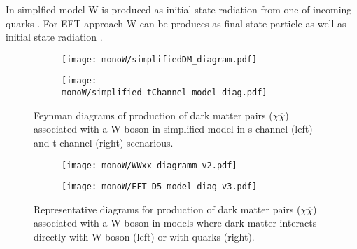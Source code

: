





In simplfied model W is produced as initial state radiation from one of incoming quarks . 
For EFT approach W can be produces as final state particle  as well as initial state radiation .

\begin{figure}[hb]

\centering
\begin{subfigure}{.5\textwidth}
  \centering
  \texttt{[image: monoW/simplifiedDM\_diagram.pdf]}
\end{subfigure}%
\begin{subfigure}{.5\textwidth}
  \centering
  \texttt{[image: monoW/simplified\_tChannel\_model\_diag.pdf]}
\end{subfigure}
  \caption{Feynman diagrams of production of dark matter pairs ($\chi\overline{\chi}$) associated with a W boson in simplified model 
	   in s-channel (left) and t-channel (right) scenarious.}
  \label{fig:feynMonoWSimple}
\end{figure}

\begin{figure}[hb]

\centering
\begin{subfigure}{.5\textwidth}
  \centering
  \texttt{[image: monoW/WWxx\_diagramm\_v2.pdf]}
\end{subfigure}%
\begin{subfigure}{.5\textwidth}
  \centering
  \texttt{[image: monoW/EFT\_D5\_model\_diag\_v3.pdf]}
\end{subfigure}
  \caption{Representative diagrams for production of dark matter pairs ($\chi\overline{\chi}$) associated with a W boson in models where
dark matter interacts directly with W boson (left) or with quarks (right).}
  \label{fig:feynMonoWEFT}
\end{figure}

